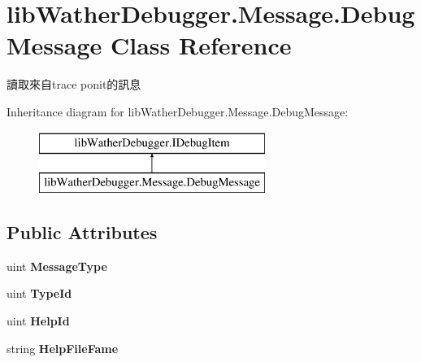 \hypertarget{classlib_wather_debugger_1_1_message_1_1_debug_message}{\section{lib\+Wather\+Debugger.\+Message.\+Debug\+Message Class Reference}
\label{classlib_wather_debugger_1_1_message_1_1_debug_message}
}


讀取來自trace ponit的訊息  


Inheritance diagram for lib\+Wather\+Debugger.\+Message.\+Debug\+Message\+:\begin{figure}[H]
\begin{center}
\leavevmode
\includegraphics[height=2.000000cm]{classlib_wather_debugger_1_1_message_1_1_debug_message}
\end{center}
\end{figure}
\subsection*{Public Attributes}
\begin{DoxyCompactItemize}
\item 
\hypertarget{classlib_wather_debugger_1_1_message_1_1_debug_message_a04ba5d4d3d75bbc9d07fdc07c192c3b4}{uint {\bfseries Message\+Type}}\label{classlib_wather_debugger_1_1_message_1_1_debug_message_a04ba5d4d3d75bbc9d07fdc07c192c3b4}

\item 
\hypertarget{classlib_wather_debugger_1_1_message_1_1_debug_message_adc0bebc901cf78d13fb477f3382b7be7}{uint {\bfseries Type\+Id}}\label{classlib_wather_debugger_1_1_message_1_1_debug_message_adc0bebc901cf78d13fb477f3382b7be7}

\item 
\hypertarget{classlib_wather_debugger_1_1_message_1_1_debug_message_a1663a434dbcc111506d3fa5139319812}{uint {\bfseries Help\+Id}}\label{classlib_wather_debugger_1_1_message_1_1_debug_message_a1663a434dbcc111506d3fa5139319812}

\item 
\hypertarget{classlib_wather_debugger_1_1_message_1_1_debug_message_a9ca6f6a35ddb57a5b7eedec735d9002a}{string {\bfseries Help\+File\+Fame}}\label{classlib_wather_debugger_1_1_message_1_1_debug_message_a9ca6f6a35ddb57a5b7eedec735d9002a}

\end{DoxyCompactItemize}
